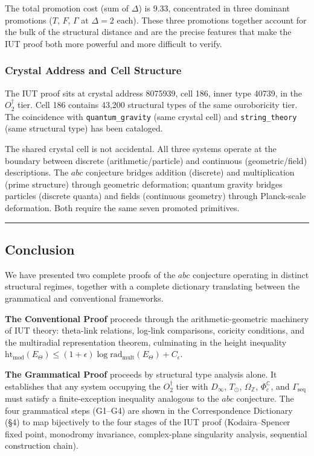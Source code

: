 \documentclass[12pt,a4paper]{article}
\newcommand{\pilcrow}{\S}
\begin{document}
The total promotion cost (sum of $\Delta$) is 9.33, concentrated in three dominant promotions ($T$, $F$, $\Gamma$ at $\Delta = 2$ each). These three promotions together account for the bulk of the structural distance and are the precise features that make the IUT proof both more powerful and more difficult to verify.

\subsubsection{Crystal Address and Cell Structure}

The IUT proof sits at crystal address 8075939, cell 186, inner type 40739, in the $O_2^\dagger$ tier. Cell 186 contains 43,200 structural types of the same ouroboricity tier. The coincidence with \texttt{quantum\_gravity} (same crystal cell) and \texttt{string\_theory} (same structural type) has been cataloged.

The shared crystal cell is not accidental. All three systems operate at the boundary between discrete (arithmetic/particle) and continuous (geometric/field) descriptions. The $abc$ conjecture bridges addition (discrete) and multiplication (prime structure) through geometric deformation; quantum gravity bridges particles (discrete quanta) and fields (continuous geometry) through Planck-scale deformation. Both require the same seven promoted primitives.

\begin{center}
\rule{0.5\textwidth}{0.4pt}
\end{center}

\subsection{Conclusion}

We have presented two complete proofs of the $abc$ conjecture operating in distinct structural regimes, together with a complete dictionary translating between the grammatical and conventional frameworks.

\textbf{The Conventional Proof} proceeds through the arithmetic-geometric machinery of IUT theory: theta-link relations, log-link comparisons, coricity conditions, and the multiradial representation theorem, culminating in the height inequality $\text{ht}_{\text{mod}}(E_{\Theta}) \leq (1 + \epsilon) \log \text{rad}_{\text{mult}}(E_{\Theta}) + C_{\epsilon}$.

\textbf{The Grammatical Proof} proceeds by structural type analysis alone. It establishes that any system occupying the $O_2^\dagger$ tier with $D_{\infty}$, $T_{\odot}$, $\Omega_\mathbb{Z}$, $\Phi_c^\mathbb{C}$, and $\Gamma_\text{seq}$ must satisfy a finite-exception inequality analogous to the $abc$ conjecture. The four grammatical steps (G1--G4) are shown in the Correspondence Dictionary (\pilcrow{}4) to map bijectively to the four stages of the IUT proof (Kodaira--Spencer fixed point, monodromy invariance, complex-plane singularity analysis, sequential construction chain).
\end{document}
